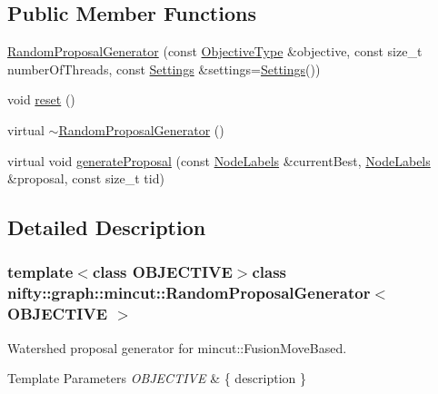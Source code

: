 \subsection*{Public Member Functions}
\begin{DoxyCompactItemize}
\item 
\hyperlink{classnifty_1_1graph_1_1mincut_1_1RandomProposalGenerator_a4cd38dcd5f463ac644870706e13561f4}{Random\+Proposal\+Generator} (const \hyperlink{classnifty_1_1graph_1_1mincut_1_1RandomProposalGenerator_a335a453972c8a979d8816ba411fdac6d}{Objective\+Type} \&objective, const size\+\_\+t number\+Of\+Threads, const \hyperlink{structnifty_1_1graph_1_1mincut_1_1RandomProposalGenerator_1_1Settings}{Settings} \&settings=\hyperlink{structnifty_1_1graph_1_1mincut_1_1RandomProposalGenerator_1_1Settings}{Settings}())
\item 
void \hyperlink{classnifty_1_1graph_1_1mincut_1_1RandomProposalGenerator_a1f9e1d1cfd240337637f51f6b0ae1564}{reset} ()
\item 
virtual \hyperlink{classnifty_1_1graph_1_1mincut_1_1RandomProposalGenerator_ae57fc0e177daa28e6ce4fa6b1dd44921}{$\sim$\+Random\+Proposal\+Generator} ()
\item 
virtual void \hyperlink{classnifty_1_1graph_1_1mincut_1_1RandomProposalGenerator_a6cb5e8315f071ebec838fb174ae57677}{generate\+Proposal} (const \hyperlink{classnifty_1_1graph_1_1mincut_1_1ProposalGeneratorBase_aa0c91c4d0f598763fdd2ae46ebd06437}{Node\+Labels} \&current\+Best, \hyperlink{classnifty_1_1graph_1_1mincut_1_1ProposalGeneratorBase_aa0c91c4d0f598763fdd2ae46ebd06437}{Node\+Labels} \&proposal, const size\+\_\+t tid)
\end{DoxyCompactItemize}


\subsection{Detailed Description}
\subsubsection*{template$<$class O\+B\+J\+E\+C\+T\+I\+V\+E$>$class nifty\+::graph\+::mincut\+::\+Random\+Proposal\+Generator$<$ O\+B\+J\+E\+C\+T\+I\+V\+E $>$}

Watershed proposal generator for mincut\+::\+Fusion\+Move\+Based. 


\begin{DoxyTemplParams}{Template Parameters}
{\em O\+B\+J\+E\+C\+T\+I\+V\+E} & \{ description \} \\
\hline
\end{DoxyTemplParams}


